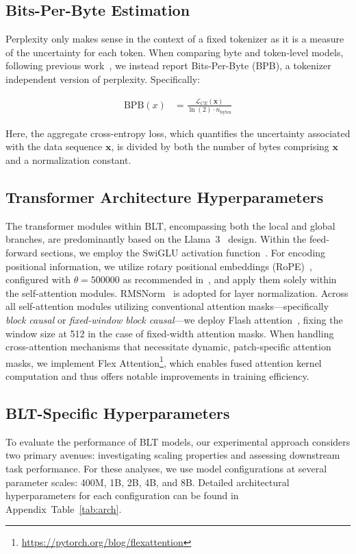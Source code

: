 \subsection{Bits-Per-Byte Estimation} Perplexity only makes sense in the context of a fixed tokenizer as it is a measure of the uncertainty for each token. When comparing byte and token-level models, following previous work~\citep{xue2022byt5, yu2023megabyte, wang2024mambabyte}, we instead report Bits-Per-Byte (BPB), a tokenizer independent version of perplexity. Specifically:

\begin{align}
    \text{BPB}(x)&= \frac{\mathcal{L}_{CE}(\pmb{x})}{\ln(2)\cdot n_{\text{bytes}}}
\end{align}

Here, the aggregate cross-entropy loss, which quantifies the uncertainty associated with the data sequence $\pmb{x}$, is divided by both the number of bytes comprising $\pmb{x}$ and a normalization constant.

\subsection{Transformer Architecture Hyperparameters} The transformer modules within {\textsc BLT}, encompassing both the local and global branches, are predominantly based on the Llama~3~\citep{dubey2024llama} design. Within the feed-forward sections, we employ the SwiGLU activation function~\citep{swiglu}. For encoding positional information, we utilize rotary positional embeddings (RoPE)~\citep{RoPe}, configured with $\theta=500000$ as recommended in~\citep{xiong2024effective}, and apply them solely within the self-attention modules. RMSNorm~\citep{RMSNorm} is adopted for layer normalization. Across all self-attention modules utilizing conventional attention masks—specifically \textit{block causal} or \textit{fixed-window block causal}—we deploy Flash attention~\citep{dao2022flashattention}, fixing the window size at 512 in the case of fixed-width attention masks. When handling cross-attention mechanisms that necessitate dynamic, patch-specific attention masks, we implement Flex Attention\footnote{\url{https://pytorch.org/blog/flexattention}}, which enables fused attention kernel computation and thus offers notable improvements in training efficiency.

\subsection{{\textsc BLT}-Specific Hyperparameters} To evaluate the performance of {\textsc BLT} models, our experimental approach considers two primary avenues: investigating scaling properties and assessing downstream task performance. For these analyses, we use model configurations at several parameter scales: 400M, 1B, 2B, 4B, and 8B. Detailed architectural hyperparameters for each configuration can be found in Appendix~Table~\ref{tab:arch}. 

